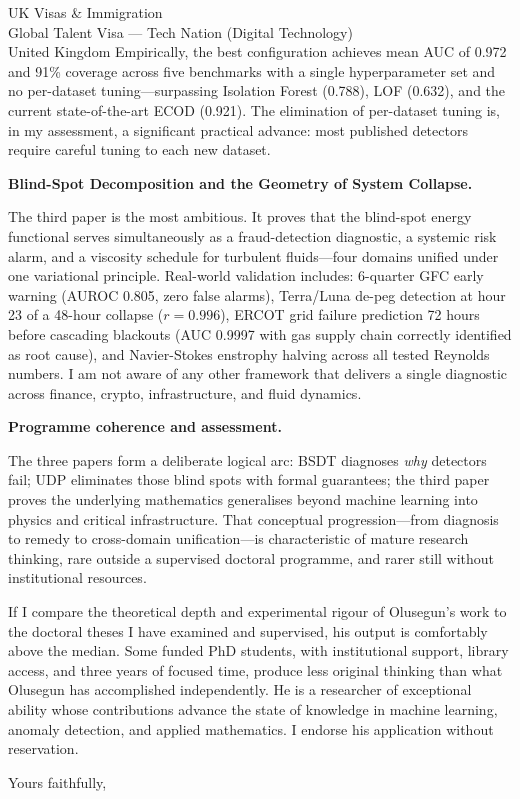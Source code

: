 \documentclass[12pt,a4paper]{letter}
\begin{document}
\begin{letter}{UK Visas \& Immigration\\
Global Talent Visa --- Tech Nation (Digital Technology)\\
United Kingdom}
Empirically, the best configuration achieves mean AUC of 0.972 and 91\% coverage across five benchmarks with a single hyperparameter set and no per-dataset tuning---surpassing Isolation Forest (0.788), LOF (0.632), and the current state-of-the-art ECOD (0.921). The elimination of per-dataset tuning is, in my assessment, a significant practical advance: most published detectors require careful tuning to each new dataset.

\textbf{Blind-Spot Decomposition and the Geometry of System Collapse.}

The third paper is the most ambitious. It proves that the blind-spot energy functional serves simultaneously as a fraud-detection diagnostic, a systemic risk alarm, and a viscosity schedule for turbulent fluids---four domains unified under one variational principle. Real-world validation includes: 6-quarter GFC early warning (AUROC 0.805, zero false alarms), Terra/Luna de-peg detection at hour 23 of a 48-hour collapse ($r = 0.996$), ERCOT grid failure prediction 72 hours before cascading blackouts (AUC 0.9997 with gas supply chain correctly identified as root cause), and Navier-Stokes enstrophy halving across all tested Reynolds numbers. I am not aware of any other framework that delivers a single diagnostic across finance, crypto, infrastructure, and fluid dynamics.

\textbf{Programme coherence and assessment.}

The three papers form a deliberate logical arc: BSDT diagnoses \textit{why} detectors fail; UDP eliminates those blind spots with formal guarantees; the third paper proves the underlying mathematics generalises beyond machine learning into physics and critical infrastructure. That conceptual progression---from diagnosis to remedy to cross-domain unification---is characteristic of mature research thinking, rare outside a supervised doctoral programme, and rarer still without institutional resources.

If I compare the theoretical depth and experimental rigour of Olusegun's work to the doctoral theses I have examined and supervised, his output is comfortably above the median. Some funded PhD students, with institutional support, library access, and three years of focused time, produce less original thinking than what Olusegun has accomplished independently. He is a researcher of exceptional ability whose contributions advance the state of knowledge in machine learning, anomaly detection, and applied mathematics. I endorse his application without reservation.

\closing{Yours faithfully,}

\end{letter}
\end{document}
